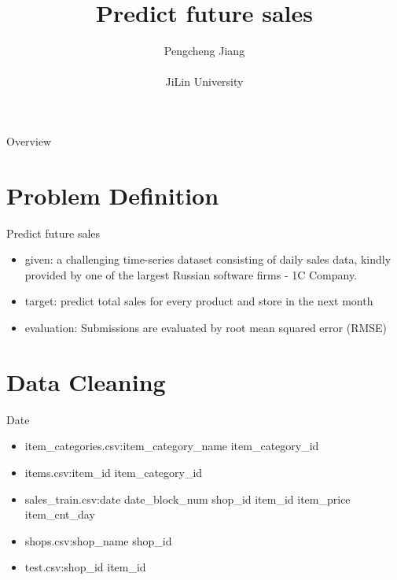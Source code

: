 \documentclass[
 size=14pt,
 paper=smartboard,  %
 mode=present, 		%
 display=slides, 	%
 style=tuliplab,  	%
 pauseslide,
 fleqn,leqno]{powerdot}
\title{Predict future sales}
\author{
Pengcheng Jiang
\\
\\JiLin University
}
\date{\gitCommitterDate}
\begin{document}
\maketitle

\begin{slide}[toc=,bm=]{Overview}
\tableofcontents[content=currentsection,type=1]
\end{slide}

\section{Problem Definition}

\begin{slide}[toc=,bm=]{Predict future sales}
  \begin{center}
  \begin{itemize}
  \item given: a challenging time-series dataset consisting of daily sales data, kindly provided by one of the largest Russian software firms - 1C Company.
  \item target: predict total sales for every product and store in the next month
  \item evaluation: Submissions are evaluated by root mean squared error (RMSE)
  \end{itemize}
  \end{center}
\end{slide}

\section{Data Cleaning}
\begin{slide}[toc=,bm=]{Date}
\begin{itemize}
  \item item_categories.csv:item_category_name	item_category_id\par
  \smallskip
  \item items.csv:item_id	item_category_id\par
  \item sales_train.csv:date  date_block_num  shop_id  item_id  item_price item_cnt_day\par
  \item shops.csv:shop_name	shop_id\par
  \item test.csv:shop_id  item_id\par
\end{itemize}
\end{slide}
\end{document}

